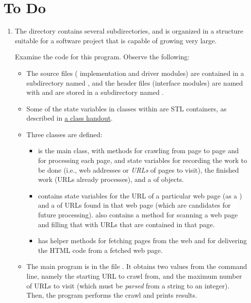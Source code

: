 \documentclass[letterpaper,10pt,openany,oneside]{sphinxmanual}
\begin{document}
\section{To Do}
\label{WebCrawler/CDS_crawler_lab_cpp:to-do}\begin{enumerate}
\item {} 
The directory  contains several subdirectories, and is
organized in a structure suitable for a software project that is
capable of growing very large.

Examine the code for this program. Observe the following:
\begin{itemize}
\item {} 
The source files ( implementation and driver modules) are
contained in a subdirectory named , and the header files
(interface modules) are named with  and are stored in a
subdirectory named .

\item {} 
Some of the state variables in classes within  are STL
containers, as described in \href{http://serc.carleton.edu/files/csinparallel/sigcse\_demos/introduction\_stl\_containers.doc}{a class
handout}.

\item {} 
Three classes are defined:
\begin{itemize}
\item {} 
 is the main class, with methods for crawling from
page to page and for processing each page, and state variables
for recording the work to be done (i.e., web addresses or
\emph{URLs} of pages to visit), the finished work (URLs already
processes), and a  of  objects.

\item {} 
 contains state variables for the URL of a particular
web page (as a ) and a  of URLs found in
that web page (which are candidates for future processing).
 also contains a method for scanning a web page and
filling that  with URLs that are contained in that
page.

\item {} 
 has helper methods for fetching pages from the web
and for delivering the HTML code from a fetched web page.

\end{itemize}

\item {} 
The main program is in the file . It obtains
two values from the command line, namely the starting URL to crawl
from, and the maximum number of URLs to visit (which must be
\emph{parsed} from a string to an integer). Then, the program performs
the crawl and prints results.


\end{itemize}
\end{enumerate}
\end{document}
